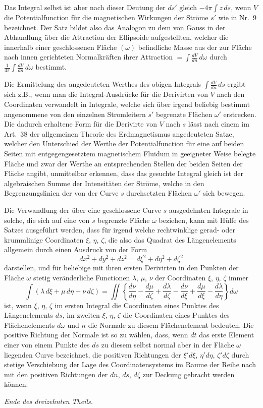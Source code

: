 \documentclass[fontsize=10pt,paper=a5,pagesize=auto]{scrbook}
\begin{document}
Das Integral selbst ist aber nach dieser Deutung der $ds'$ gleich $-4\pi \int z \, ds$, wenn $V$ die Potentialfunction für die magnetischen Wirkungen der Ströme $s'$ wie in Nr.~9 bezeichnet. Der Satz bildet also das Analogon zu dem von Gauss in der Abhandlung über die Attraction der Ellipsoide aufgestellten, welcher die innerhalb einer geschlossenen Fläche $(\omega)$ befindliche Masse aus der zur Fläche nach innen gerichteten Normalkräften ihrer Attraction $= \int \frac{dV}{dn} \, d\omega$ durch $\frac{1}{4\pi} \int \frac{dV}{dn} \, d\omega$ bestimmt.

Die Ermittelung des angedeuteten Werthes des obigen Integrals $\int \frac{dV}{dn} \, ds$ ergibt sich z.B., wenn man die Integral-Ausdrücke für die Derivirten von $V$ nach den Coordinaten verwandelt in Integrale, welche sich über irgend beliebig bestimmt angenommene von den einzelnen Stromleitern $s'$ begrenzte Flächen $\omega'$ erstrecken. Die dadurch erhaltene Form für die Derivirte von $V$ nach $s$ lässt nach einem im Art.~38 der allgemeinen Theorie des Erdmagnetismus angedeuteten Satze, welcher den Unterschied der Werthe der Potentialfunction für eine auf beiden Seiten mit entgegengesetztem magnetischem Fluidum in geeigneter Weise belegte Fläche und zwar der Werthe an entsprechenden Stellen der beiden Seiten der Fläche angibt, unmittelbar erkennen, dass das gesuchte Integral gleich ist der algebraischen Summe der Intensitäten der Ströme, welche in den Begrenzungslinien der von der Curve $s$ durchsetzten Flächen $\omega'$ sich bewegen.

Die Verwandlung der über eine geschlossene Curve $s$ ausgedehnten Integrale in solche, die sich auf eine von $s$ begrenzte Fläche $\omega$ beziehen, kann mit Hülfe des Satzes ausgeführt werden, dass für irgend welche rechtwinklige gerad- oder krummlinige Coordinaten $\xi$, $\eta$, $\zeta$, die also das Quadrat des Längenelements allgemein durch einen Ausdruck von der Form
\[
dx^2 + dy^2 + dz^2 = d\xi^2 + d\eta^2 + d\zeta^2
\]
darstellen, und für beliebige mit ihren ersten Derivirten in den Punkten der Fläche $\omega$ stetig veränderliche Functionen $\lambda$, $\mu$, $\nu$ der Coordinaten $\xi$, $\eta$, $\zeta$ immer
\[
\int (\lambda \, d\xi + \mu \, d\eta + \nu \, d\zeta) = \iint \left\{ \frac{d\nu}{d\eta} - \frac{d\mu}{d\zeta} + \frac{d\lambda}{d\zeta} - \frac{d\nu}{d\xi} + \frac{d\mu}{d\xi} - \frac{d\lambda}{d\eta} \right\} d\omega
\]
ist, wenn $\xi$, $\eta$, $\zeta$ im ersten Integral die Coordinaten eines Punktes des Längenelements $ds$, im zweiten $\xi$, $\eta$, $\zeta$ die Coordinaten eines Punktes des Flächenelements $d\omega$ und $n$ die Normale zu diesem Flächenelement bedeuten. Die positive Richtung der Normale ist so zu wählen, dass, wenn $dt$ das erste Element einer von einem Punkte des $ds$ zu diesem selbst normal aber in der Fläche $\omega$ liegenden Curve bezeichnet, die positiven Richtungen der $\xi' d\xi$, $\eta' d\eta$, $\zeta' d\zeta$ durch stetige Verschiebung der Lage des Coordinatensystems im Raume der Reihe nach mit den positiven Richtungen der $dn$, $ds$, $d\zeta$ zur Deckung gebracht werden können.

\vfill
\begin{center}
\textit{Ende des dreizehnten Theils.}
\end{center}
\end{document}
